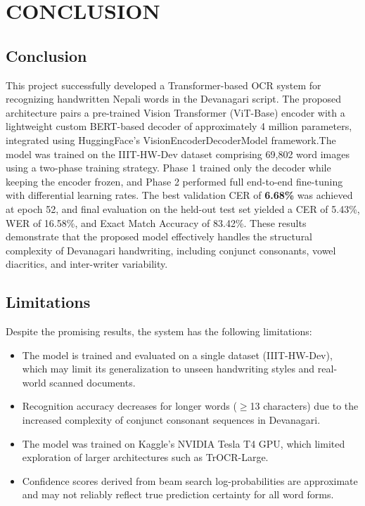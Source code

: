\chapter{CONCLUSION}
\section{Conclusion}
This project successfully developed a Transformer-based OCR system for recognizing handwritten Nepali words in the Devanagari script. The proposed architecture pairs a pre-trained Vision Transformer (ViT-Base) encoder with 
a lightweight custom BERT-based decoder of approximately 4 million parameters, integrated using HuggingFace's VisionEncoderDecoderModel framework.The model was trained on the IIIT-HW-Dev dataset comprising 69,802 word images using a two-phase training strategy. Phase 1 trained only the decoder while keeping the encoder frozen, and Phase 2 performed full end-to-end 
fine-tuning with differential learning rates. The best validation CER of \textbf{6.68\%} was achieved at epoch 52, and final evaluation on the held-out test set yielded a CER of 5.43\%, WER of 16.58\%, and Exact Match Accuracy of 83.42\%. These results demonstrate that the proposed model effectively handles the structural complexity of Devanagari handwriting, including conjunct consonants, vowel diacritics, and inter-writer variability.

\section{Limitations}
Despite the promising results, the system has the following limitations:
\begin{itemize}
    \item The model is trained and evaluated on a single dataset (IIIT-HW-Dev), which may limit its generalization to unseen handwriting styles and real-world scanned documents.
    \item Recognition accuracy decreases for longer words ($\geq$13 characters) due to the increased complexity of conjunct 
    consonant sequences in Devanagari.
    \item The model was trained on Kaggle's NVIDIA Tesla T4 GPU, which limited exploration of larger architectures such as TrOCR-Large.
    \item Confidence scores derived from beam search log-probabilities are approximate and may not reliably reflect true prediction certainty for all word forms.
\end{itemize}

